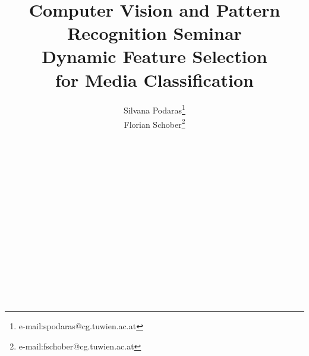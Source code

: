 \documentclass[conference,onecolumn]{acmsiggraph}
\title{
{
\phantom
\bigskip \\ \bigskip \\ \bigskip \\  \bigskip \\ 
\bigskip \\ \bigskip \\  \bigskip \\  \bigskip \\ 
\bigskip \\ \bigskip \\  \bigskip \\  \bigskip \\ 
\bigskip \\ \bigskip \\  \bigskip \\  \bigskip \\ 
\bigskip \\ \bigskip \\  \bigskip \\  \bigskip \\ 
\LARGE Computer Vision and Pattern Recognition Seminar } 
 \\ \medskip
 {\fontsize{36}{48} \selectfont 
  Dynamic Feature Selection
  \\ \medskip 
   for Media Classification}}
\author{Silvana Podaras\thanks{e-mail:spodaras@cg.tuwien.ac.at}\\Florian Schober\thanks{e-mail:fschober@cg.tuwien.ac.at}}
\begin{document}
\fontsize{10}{12} \selectfont
\renewcommand{\abstractname}{\fontsize{10}{12} \selectfont Abstract}


\maketitle
\copyrightspace
\bigskip \\ \bigskip \\ \bigskip \\  \bigskip \\ 
\bigskip \\ \bigskip \\  \bigskip \\  \bigskip \\ 
\bigskip \\ \bigskip \\  \bigskip \\  \bigskip \\ 

\newpage

\tableofcontents
\newpage






\newpage
\fontsize{8}{10} \selectfont



\end{document}

